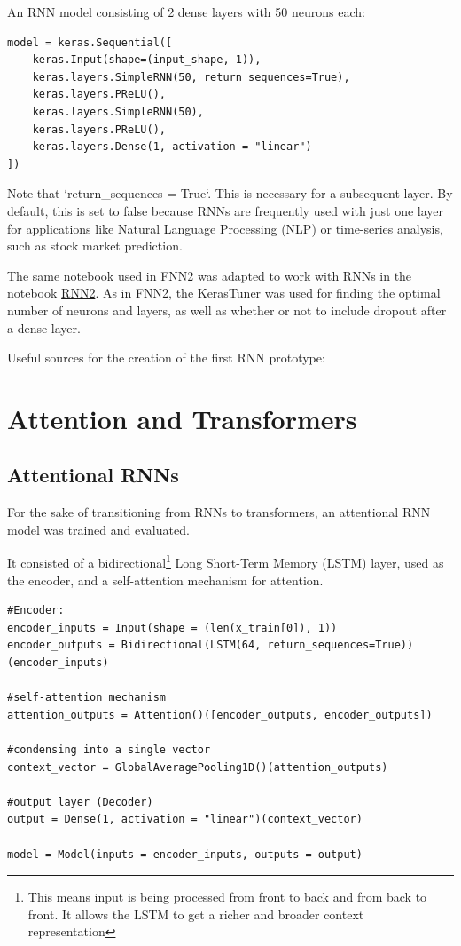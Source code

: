 \documentclass{article}
\begin{document}
An RNN model consisting of 2 dense layers with 50 neurons each:

\begin{Verbatim}
model = keras.Sequential([
    keras.Input(shape=(input_shape, 1)),
    keras.layers.SimpleRNN(50, return_sequences=True),
    keras.layers.PReLU(),
    keras.layers.SimpleRNN(50),
    keras.layers.PReLU(),
    keras.layers.Dense(1, activation = "linear")
])
\end{Verbatim}
Note that `return\_sequences = True`. This is necessary for a subsequent layer. By default, this is set to false because RNNs are frequently used with just one layer for applications like Natural Language Processing (NLP) or time-series analysis, such as stock market prediction.

The same notebook used in FNN2 was adapted to work with RNNs in the notebook \href{https://github.com/AntonStantan/matura/blob/main/RNN/RNN2.ipynb}{RNN2}. As in FNN2, the KerasTuner was used for finding the optimal number of neurons and layers, as well as whether or not to include dropout after a dense layer.

Useful sources for the creation of the first RNN prototype:
\cite{bowman2015recursiveneuralnetworkslearn, tensorflow_keras_rnn, ibm_rnn}


\section{Attention and Transformers}

\subsection{Attentional RNNs}
For the sake of transitioning from RNNs to transformers, an attentional RNN model was trained and evaluated.

It consisted of a bidirectional\footnote{This means input is being processed from front to back and from back to front. It allows the LSTM to get a richer and broader context representation} Long Short-Term Memory (LSTM) layer, used as the encoder, and a self-attention mechanism for attention.

\begin{Verbatim}
#Encoder:
encoder_inputs = Input(shape = (len(x_train[0]), 1))
encoder_outputs = Bidirectional(LSTM(64, return_sequences=True))(encoder_inputs)

#self-attention mechanism
attention_outputs = Attention()([encoder_outputs, encoder_outputs])

#condensing into a single vector
context_vector = GlobalAveragePooling1D()(attention_outputs)

#output layer (Decoder)
output = Dense(1, activation = "linear")(context_vector)

model = Model(inputs = encoder_inputs, outputs = output)
\end{Verbatim}
\end{document}
